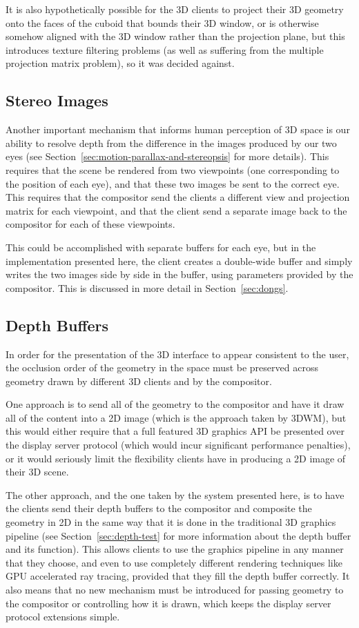 It is also hypothetically possible for the 3D clients to project their 3D geometry onto the faces of the cuboid that bounds their 3D window, or is otherwise somehow aligned with the 3D window rather than the projection plane, but this introduces texture filtering problems (as well as suffering from the multiple projection matrix problem), so it was decided against.

\subsection{Stereo Images}
Another important mechanism that informs human perception of 3D space is our ability to resolve depth from the difference in the images produced by our two eyes (see Section~\ref{sec:motion-parallax-and-stereopsis} for more details). This requires that the scene be rendered from two viewpoints (one corresponding to the position of each eye), and that these two images be sent to the correct eye. This requires that the compositor send the clients a different view and projection matrix for each viewpoint, and that the client send a separate image back to the compositor for each of these viewpoints. 

This could be accomplished with separate buffers for each eye, but in the implementation presented here, the client creates a double-wide buffer and simply writes the two images side by side in the buffer, using parameters provided by the compositor. This is discussed in more detail in Section~\ref{sec:dongs}.

\subsection{Depth Buffers}

In order for the presentation of the 3D interface to appear consistent to the user, the occlusion order of the geometry in the space must be preserved across geometry drawn by different 3D clients and by the compositor. 

One approach is to send all of the geometry to the compositor and have it draw all of the content into a 2D image (which is the approach taken by 3DWM), but this would either require that a full featured 3D graphics API be presented over the display server protocol (which would incur significant performance penalties), or it would seriously limit the flexibility clients have in producing a 2D image of their 3D scene.

The other approach, and the one taken by the system presented here, is to have the clients send their depth buffers to the compositor and composite the geometry in 2D in the same way that it is done in the traditional 3D graphics pipeline (see Section~\ref{sec:depth-test} for more information about the depth buffer and its function). This allows clients to use the graphics pipeline in any manner that they choose, and even to use completely different rendering techniques like GPU accelerated ray tracing, provided that they fill the depth buffer correctly. It also means that no new mechanism must be introduced for passing geometry to the compositor or controlling how it is drawn, which keeps the display server protocol extensions simple.

